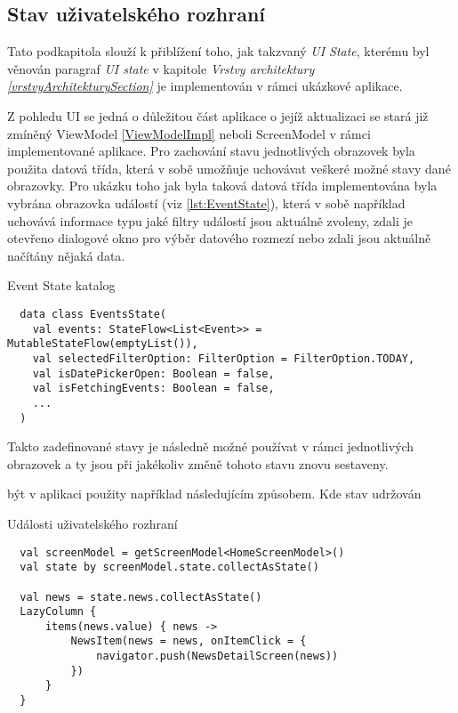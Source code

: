 
\subsection{Stav uživatelského rozhraní} \label{stateHandlingImpl}
Tato podkapitola slouží k přiblížení toho, jak takzvaný \textit{UI State}, kterému byl věnován paragraf \textit{UI state} v 
kapitole \textit{Vrstvy architektury \ref{vrstvyArchitekturySection} } je implementován v rámci ukázkové aplikace.

Z pohledu UI se jedná o důležitou část aplikace o jejíž aktualizaci se stará již zmíněný ViewModel \ref{ViewModelImpl} neboli ScreenModel v rámci
implementované aplikace. 
Pro zachování stavu jednotlivých obrazovek byla použita datová třída, která v sobě umožňuje uchovávat veškeré možné stavy dané obrazovky.
Pro ukázku toho jak byla taková datová třída implementována byla vybrána obrazovka událostí (viz \ref{lst:EventState}), která v sobě 
například uchovává informace typu jaké filtry událostí jsou aktuálně zvoleny, zdali je otevřeno dialogové okno pro výběr datového rozmezí 
nebo zdali jsou aktuálně načítány nějaká data.
\begin{listing}
\caption{Event State katalog}\label{lst:EventState}
\begin{verbatim}
  data class EventsState(
    val events: StateFlow<List<Event>> = MutableStateFlow(emptyList()),
    val selectedFilterOption: FilterOption = FilterOption.TODAY,
    val isDatePickerOpen: Boolean = false,
    val isFetchingEvents: Boolean = false,
    ...
  )
\end{verbatim}
\end{listing}

Takto zadefinované stavy je následně možné používat v rámci jednotlivých obrazovek a ty jsou při jakékoliv změně tohoto stavu znovu sestaveny.

být v aplikaci použity například následujícím způsobem. Kde stav udržován 
\begin{listing}
\caption{Události uživatelského rozhraní}\label{lst:StateImpl}
\begin{verbatim}
  val screenModel = getScreenModel<HomeScreenModel>()
  val state by screenModel.state.collectAsState()

  val news = state.news.collectAsState()
  LazyColumn {
      items(news.value) { news ->
          NewsItem(news = news, onItemClick = {
              navigator.push(NewsDetailScreen(news))
          })
      }
  }
\end{verbatim}
\end{listing}

